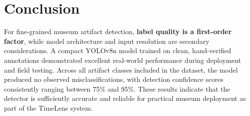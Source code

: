 \section{Conclusion}
For fine-grained museum artifact detection, \textbf{label quality is a first-order factor}, while model architecture and input resolution are secondary considerations. A compact YOLOv8n model trained on clean, hand-verified annotations demonstrated excellent real-world performance during deployment and field testing. Across all artifact classes included in the dataset, the model produced no observed misclassifications, with detection confidence scores consistently ranging between 75\% and 95\%. These results indicate that the detector is sufficiently accurate and reliable for practical museum deployment as part of the TimeLens system.
